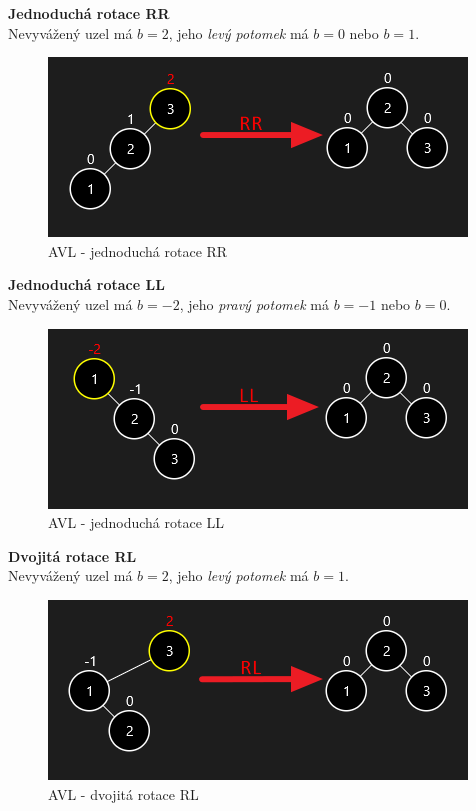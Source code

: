 \documentclass[
  biblatex=false,
  font=serif,
  glossaries=false,
  tables=false,
  theorems=false,
  index
]{kidiplom}
\begin{document}
\noindent\textbf{Jednoduchá rotace RR}\\
\noindent Nevyvážený uzel má $b = 2$, jeho \textit{levý potomek} má $b = 0$ nebo $b = 1$.
\begin{figure}[h!]
\centering
	\includegraphics[scale=0.8]{obrazky/11RR.png}
	\caption{AVL - jednoduchá rotace RR}
\end{figure}

\noindent\textbf{Jednoduchá rotace LL}\\
\noindent Nevyvážený uzel má $b = -2$, jeho \textit{pravý potomek} má $b = -1$ nebo $b = 0$.
\begin{figure}[h!]
\centering
	\includegraphics[scale=0.8]{obrazky/12LL.png}
	\caption{AVL - jednoduchá rotace LL}
\end{figure}

\newpage
\noindent\textbf{Dvojitá rotace RL}\\
\noindent Nevyvážený uzel má $b = 2$, jeho \textit{levý potomek} má $b = 1$.
\begin{figure}[h!]
\centering
	\includegraphics[scale=0.8]{obrazky/13RL.png}
	\caption{AVL - dvojitá rotace RL}
\end{figure}
\end{document}
